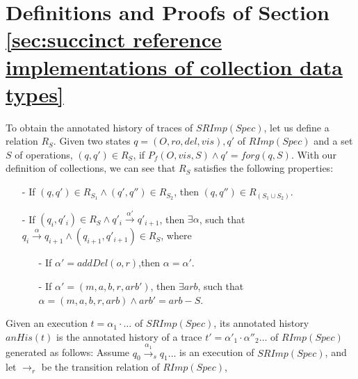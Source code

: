 

\section{Definitions and Proofs of Section \ref{sec:succinct reference implementations of collection data types}}
\label{sec:appendix definitions and proofs of section succinct reference implementations of collection data types} 

To obtain the annotated history of traces of $SRImp(Spec)$, let us define a relation $R_S$. Given two states $q=(O,\mathit{ro},\mathit{del},\mathit{vis}),q'$ of $RImp(Spec)$ and a set $S$ of operations, $(q,q') \in R_S$, if $P_f(O,\mathit{vis},S) \wedge q' = forg(q,S)$. With our definition of collections, we can see that $R_S$ satisfies the following properties:

\begin{itemize}
\setlength{\itemsep}{0.5pt}
\item[-] If $(q,q') \in R_{ S_1 } \wedge (q',q'') \in R_{ S_2 }$, then $(q,q'') \in R_{ ( S_1 \cup S_2 ) }$.

\item[-] If $(q_i,q'_i) \in R_{S} \wedge q'_i {\xrightarrow{\alpha'}} q'_{i+1}$, then $\exists \alpha$, such that $q_i {\xrightarrow{\alpha}} q_{i+1} \wedge (q_{i+1},q'_{i+1}) \in R_{S}$, where

    \begin{itemize}
    \setlength{\itemsep}{0.5pt}
    \item[-] If $\alpha' = addDel(o,r)$,then $\alpha = \alpha'$.

    \item[-] If $\alpha'=(m,a,b,r,\mathit{arb}')$, then $\exists \mathit{arb}$, such that $\alpha=(m,a,b,r,\mathit{arb}) \wedge \mathit{arb}' = \mathit{arb} - S$.
    \end{itemize}
\end{itemize}


Given an execution $t = \alpha_1 \cdot \ldots$ of $SRImp(Spec)$, its annotated history $anHis(t)$ is the annotated history of a trace $t' = \alpha'_1 \cdot \alpha''_2 \ldots$ of $RImp(Spec)$ generated as follows: Assume $q_0 {\xrightarrow{\alpha_1}}_s q_1 \ldots$ is an execution of $SRImp(Spec)$, and let $\rightarrow_r$ be the transition relation of $RImp(Spec)$,

